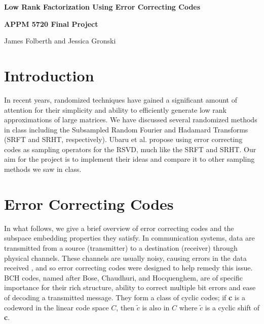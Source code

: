 \documentclass[12pt]{article}
\newcommand{\tbf}{\textbf}
\begin{document}
\flushleft

\centerline{\large \bf Low Rank Factorization Using Error Correcting Codes}
\centerline{\large \bf APPM 5720 Final Project}
\vspace{\baselineskip}
{\large \centerline{James Folberth and Jessica Gronski}}
\vspace{\baselineskip}

\section{Introduction}
In recent years, randomized techniques have gained a significant amount of attention for their simplicity and ability to efficiently generate low rank approximations of large matrices. We have discussed several randomized methods in class including the Subsampled Random Fourier and Hadamard Transforms (SRFT and SRHT, respectively). Ubaru et al. \cite{ubaru2015low} propose using error correcting codes as sampling operators for the RSVD, much like the SRFT and SRHT.  Our aim for the project is to implement their ideas and compare it to other sampling methods we saw in class.

\section{Error Correcting Codes}
In what follows, we give a brief overview of error correcting codes and the subspace embedding properties they satisfy. In communication systems, data are transmitted from a source (transmitter) to a destination (receiver) through physical channels. These channels are usually noisy, causing errors in the data received \cite{ubaru2015low}, and so error correcting codes were designed to help remedy this issue. BCH codes, named after  Bose, Chaudhuri, and Hocquenghem, are of specific importance for their rich structure, ability to correct multiple bit errors and ease of decoding a transmitted message. They form a class of cyclic codes; if \tbf{c} is a codeword in the linear code space $C$, then \tbf{$\tilde{c}$} is also in $C$ where \tbf{$\tilde{c}$} is a cyclic shift of \tbf{c}. 

\vspace{3mm}
\end{document}
